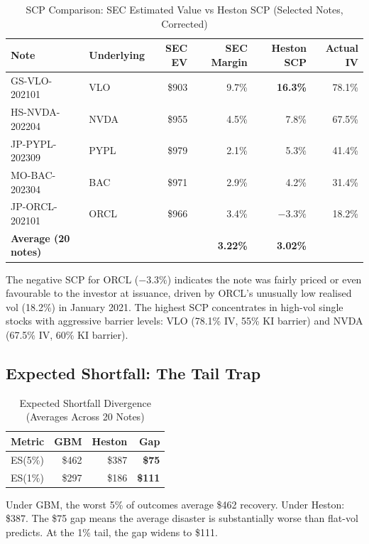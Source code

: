 \documentclass[10pt,a4paper]{article}
\begin{document}
\begin{table}[H]\centering\small
\caption{SCP Comparison: SEC Estimated Value vs Heston SCP (Selected Notes, Corrected)}
\begin{tabular}{@{}llrrrr@{}}\toprule
\textbf{Note}&\textbf{Underlying}&\textbf{SEC EV}&\textbf{SEC Margin}&\textbf{Heston SCP}&\textbf{Actual IV}\\\midrule
GS-VLO-202101&VLO&\$903&9.7\%&\textbf{16.3\%}&78.1\%\\
HS-NVDA-202204&NVDA&\$955&4.5\%&7.8\%&67.5\%\\
JP-PYPL-202309&PYPL&\$979&2.1\%&5.3\%&41.4\%\\
MO-BAC-202304&BAC&\$971&2.9\%&4.2\%&31.4\%\\
JP-ORCL-202101&ORCL&\$966&3.4\%&$-3.3\%$&18.2\%\\
\midrule
\textbf{Average (20 notes)}&&&\textbf{3.22\%}&\textbf{3.02\%}&\\\bottomrule
\end{tabular}\end{table}

The negative SCP for ORCL ($-3.3\%$) indicates the note was fairly priced or even favourable to the investor at issuance, driven by ORCL's unusually low realised vol (18.2\%) in January 2021. The highest SCP concentrates in high-vol single stocks with aggressive barrier levels: VLO (78.1\% IV, 55\% KI barrier) and NVDA (67.5\% IV, 60\% KI barrier).

\subsection{Expected Shortfall: The Tail Trap}
\begin{table}[H]\centering\small
\caption{Expected Shortfall Divergence (Averages Across 20 Notes)}
\begin{tabular}{@{}lrrr@{}}\toprule
\textbf{Metric}&\textbf{GBM}&\textbf{Heston}&\textbf{Gap}\\\midrule
ES(5\%)&\$462&\$387&\textbf{\$75}\\
ES(1\%)&\$297&\$186&\textbf{\$111}\\
\bottomrule\end{tabular}\end{table}

Under GBM, the worst 5\% of outcomes average \$462 recovery. Under Heston: \$387. The \$75 gap means the average disaster is substantially worse than flat-vol predicts. At the 1\% tail, the gap widens to \$111.
\end{document}
